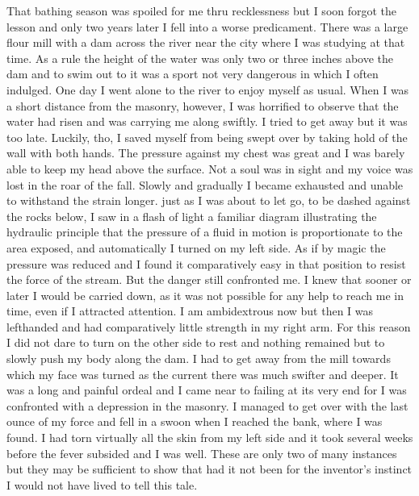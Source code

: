 \documentclass[a4paper,12pt,english,twoside,openright]{memoir}
\begin{document}
	That bathing season was spoiled for me thru recklessness but I soon forgot the lesson and only 
	two years later I fell into a worse predicament.  There was a large flour mill with a dam across the 
	river near the city where I was studying at that time.  As a rule the height of the water was only 
	two or three inches above the dam and to swim out to it was a sport not very dangerous in which I 
	often indulged.  One day I went alone to the river to enjoy myself as usual.  When I was a short 
	distance from the masonry, however, I was horrified to observe that the water had risen and was 
	carrying me along swiftly.  I tried to get away but it was too late.  Luckily, tho, I saved myself from 
	being swept over by taking hold of the wall with both hands.  The pressure against my chest was 
	great and I was barely able to keep my head above the surface.  Not a soul was in sight and my 
	voice was lost in the roar of the fall.  Slowly and gradually I became exhausted and unable to 
	withstand the strain longer.  just as I was about to let go, to be dashed against the rocks below, I 
	saw in a flash of light a familiar diagram illustrating the hydraulic principle that the pressure of a 
	fluid in motion is proportionate to the area exposed, and automatically I turned on my left side.  As 
	if by magic the pressure was reduced and I found it comparatively easy in that position to resist 
	the force of the stream.  But the danger still confronted me.  I knew that sooner or later I would be 
	carried down, as it was not possible for any help to reach me in time, even if I attracted attention.  
	I am ambidextrous now but then I was lefthanded and had comparatively little strength in my right 
	arm.  For this reason I did not dare to turn on the other side to rest and nothing remained but to 
	slowly push my body along the dam.  I had to get away from the mill towards which my face was 
	turned as the current there was much swifter and deeper.  It was a long and painful ordeal and I 
	came near to failing at its very end for I was confronted with a depression in the masonry.  I 
	managed to get over with the last ounce of my force and fell in a swoon when I reached the bank, 
	where I was found.  I had torn virtually all the skin from my left side and it took several weeks 
	before the fever subsided and I was well.  These are only two of many instances but they may be 
	sufficient to show that had it not been for the inventor's instinct I would not have lived to tell this 
	tale.  
	
\end{document}
